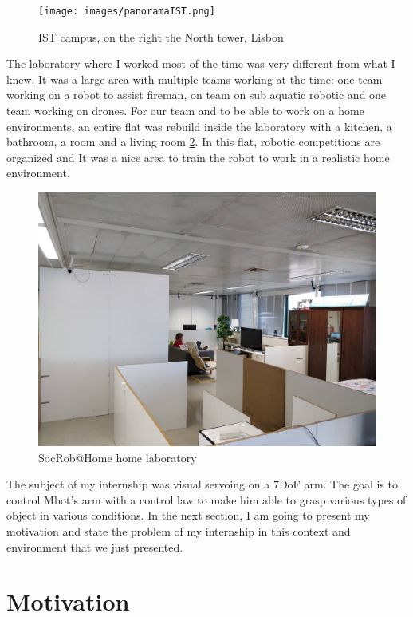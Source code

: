 \begin{figure} [!ht]
    \centering
    \texttt{[image: images/panoramaIST.png]}
    \caption{IST campus, on the right the North tower, Lisbon}
    \label{IST}
\end{figure}

The laboratory where I worked most of the time was very different from what I knew. It was a large area with multiple teams working at the time: one team working on a robot to assist fireman, on team on sub aquatic robotic and one team working on drones. For our team and to be able to work on a home environments, an entire flat was rebuild inside the laboratory with a kitchen, a bathroom, a room and a living room \ref{laboratory}. In this flat, robotic competitions are organized and It was a nice area to train the robot to work in a realistic home environment.\\[0.05cm]

\begin{figure} [!ht]
    \centering
    \includegraphics[width=0.8\linewidth]{images/41339074_481840472313432_6451621996257083392_n.jpg}
    \caption{SocRob@Home home laboratory}
    \label{laboratory}
\end{figure}


The subject of my internship was visual servoing on a 7\gls{DoF} arm. The goal is to control Mbot's arm with a  control law to make him able to grasp various types of object in various conditions.
In the next section, I am going to present my motivation and state the problem of my internship in this context and environment that we just presented.
\newpage


\section{Motivation}

